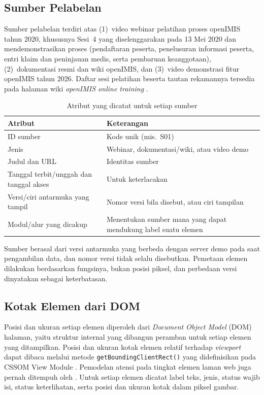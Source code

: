 \subsection{Sumber Pelabelan}
\label{subsec:sumber}

Sumber pelabelan terdiri atas (1)~video webinar pelatihan proses openIMIS tahun 2020, khususnya Sesi~4 yang diselenggarakan pada 13 Mei 2020 dan mendemonstrasikan proses (pendaftaran peserta, penelusuran informasi peserta, entri klaim dan peninjauan medis, serta pembaruan keanggotaan), (2)~dokumentasi resmi dan wiki openIMIS, dan (3)~video demonstrasi fitur openIMIS tahun 2026. Daftar sesi pelatihan beserta tautan rekamannya tersedia pada halaman wiki \emph{openIMIS online training} \citep{openimis2026}.

\begin{table}[H]
  \centering
  \caption{Atribut yang dicatat untuk setiap sumber}
  \label{tab:atribut-sumber}
  \begin{tabularx}{\textwidth}{>{\raggedright\arraybackslash}p{}>{\raggedright\arraybackslash}X}
    \hline
    \textbf{Atribut} & \textbf{Keterangan} \\
    \hline
    ID sumber & Kode unik (mis.\ S01) \\
    Jenis & Webinar, dokumentasi/wiki, atau video demo \\
    Judul dan URL & Identitas sumber \\
    Tanggal terbit/unggah dan tanggal akses & Untuk keterlacakan \\
    Versi/ciri antarmuka yang tampil & Nomor versi bila disebut, atau ciri tampilan \\
    Modul/alur yang dicakup & Menentukan sumber mana yang dapat mendukung label suatu elemen \\
    \hline
  \end{tabularx}
\end{table}

Sumber berasal dari versi antarmuka yang berbeda dengan server demo pada saat pengambilan data, dan nomor versi tidak selalu disebutkan. Pemetaan elemen dilakukan berdasarkan fungsinya, bukan posisi piksel, dan perbedaan versi dinyatakan sebagai keterbatasan.

\subsection{Kotak Elemen dari DOM}
\label{subsec:kotak-dom}

Posisi dan ukuran setiap elemen diperoleh dari \emph{Document Object Model} (DOM) halaman, yaitu struktur internal yang dibangun peramban untuk setiap elemen yang ditampilkan. Posisi dan ukuran kotak elemen relatif terhadap \emph{viewport} dapat dibaca melalui metode \texttt{getBoundingClientRect()} yang didefinisikan pada CSSOM View Module \citep{pieters2013cssom}. Pemodelan atensi pada tingkat elemen laman web juga pernah ditempuh oleh \citet{buscher2009what}. Untuk setiap elemen dicatat label teks, jenis, status wajib isi, status keterlihatan, serta posisi dan ukuran kotak dalam piksel gambar.

